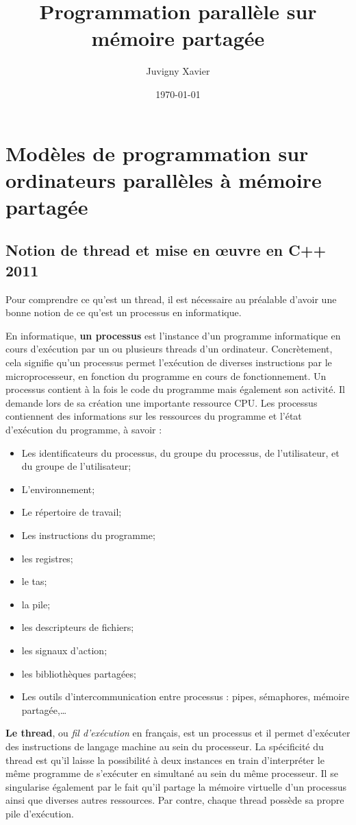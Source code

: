 \documentclass[fleqn,11pt]{article}
\title{Programmation parallèle sur mémoire partagée}
\author{Juvigny Xavier}
\date{\today}
\begin{document}
\maketitle
\tableofcontents

\section{Modèles de programmation sur ordinateurs parallèles à mémoire partagée}

\subsection{Notion de thread et mise en {\oe}uvre en C++ 2011}

Pour comprendre ce qu'est un thread, il est nécessaire au préalable d'avoir une bonne notion de ce
qu'est un processus en informatique.

En informatique, \textbf{un processus} est l’instance d’un programme informatique en cours d’exécution par un ou plusieurs threads d’un ordinateur. Concrètement, cela signifie qu’un processus permet l’exécution de diverses instructions par le microprocesseur, en fonction du programme en cours de fonctionnement. Un processus contient à la fois le code du programme mais également son activité. Il demande lors de sa création une
importante ressource CPU. Les processus contiennent des informations sur les ressources
du programme et l'état d'exécution du programme, à savoir :
\begin{itemize}
 \item Les identificateurs du processus, du groupe du processus, de l'utilisateur, et du groupe de l'utilisateur;
 \item L'environnement;
 \item Le répertoire de travail;
 \item Les instructions du programme;
 \item les registres;
 \item le tas;
 \item la pile;
 \item les descripteurs de fichiers;
 \item les signaux d'action;
 \item les bibliothèques partagées;
 \item Les outils d'intercommunication entre processus : pipes, sémaphores, mémoire partagée,\ldots
\end{itemize}

\textbf{Le thread}, ou \textsl{fil d’exécution} en français, est un  processus et il permet d’exécuter des instructions de langage machine au sein du processeur. La spécificité du thread est qu’il laisse la possibilité à deux instances en train d’interpréter le même programme de s’exécuter en simultané au sein du même processeur. Il se singularise également par le fait qu'il partage la mémoire virtuelle d'un processus ainsi que diverses autres ressources. Par contre, chaque thread possède sa propre pile d'exécution.
\end{document}
